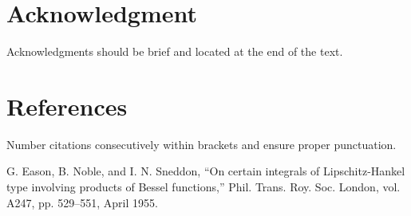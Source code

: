\documentclass[conference]{IEEEtran}
\begin{document}
\section*{Acknowledgment}
Acknowledgments should be brief and located at the end of the text.

\section*{References}
Number citations consecutively within brackets and ensure proper punctuation.

\begin{thebibliography}{00}
 G. Eason, B. Noble, and I. N. Sneddon, ``On certain integrals of Lipschitz-Hankel type involving products of Bessel functions,'' Phil. Trans. Roy. Soc. London, vol. A247, pp. 529--551, April 1955.
\end{thebibliography}
\end{document}
